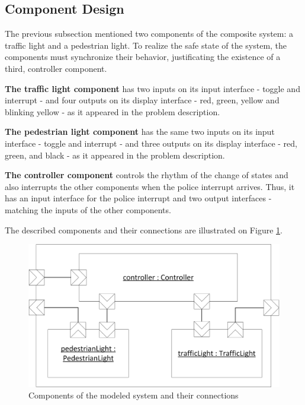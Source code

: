 \subsection{Component Design} \label{subs_casestudycomps}

The previous subsection mentioned two components of the composite system: a traffic light and a pedestrian light. To realize the safe state of the system, the components must synchronize their behavior, justificating the existence of a third, controller component. 

\textbf{The traffic light component} has two inputs on its input interface - toggle and interrupt - and four outputs on its display interface - red, green, yellow and blinking yellow - as it appeared in the problem description.

\textbf{The pedestrian light component} has the same two inputs on its input interface - toggle and interrupt - and three outputs on its display interface - red, green, and black - as it appeared in the problem description.

\textbf{The controller component} controls the rhythm of the change of states and also interrupts the other components when the police interrupt arrives. Thus, it has an input interface for the police interrupt and two output interfaces - matching the inputs of the other components.

The described components and their connections are illustrated on Figure \ref{fig_casestudy_blockdiagram}.

\begin{figure}[!ht] 
	\centering
		\includegraphics[width=130mm, keepaspectratio]{figures/casestudy_blockdiagram.png}
	\caption{Components of the modeled system and their connections} 
	\label{fig_casestudy_blockdiagram}
\end{figure}

